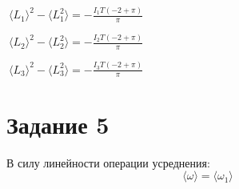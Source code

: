 \documentclass[11pt]{article}
\begin{document}
    \(\displaystyle \
 \langle L_1 \rangle^2 - \langle L_1^2 \rangle = - \frac{I_{1} T \left(-2 + \pi\right)}{\pi}\)

    
    \(\displaystyle \
 \langle L_2 \rangle^2 - \langle L_2^2 \rangle = - \frac{I_{2} T \left(-2 + \pi\right)}{\pi}\)

    
    \(\displaystyle \
 \langle L_3 \rangle^2 - \langle L_3^2 \rangle = - \frac{I_{3} T \left(-2 + \pi\right)}{\pi}\)

    
    \hypertarget{ux437ux430ux434ux430ux43dux438ux435-5}{%
\section{Задание 5}\label{ux437ux430ux434ux430ux43dux438ux435-5}}

    В силу линейности операции усреднения:
\[\langle \omega \rangle = \langle \omega_1 \rangle\]


    
    
    
\end{document}
